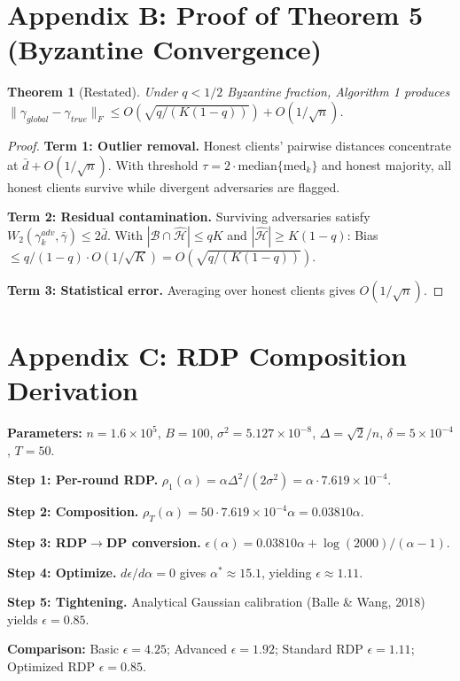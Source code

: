 \documentclass[11pt]{article}
\theoremstyle{plain}
\newtheorem{theorem}{Theorem}
\theoremstyle{definition}
\theoremstyle{remark}
\begin{document}
\section*{Appendix B: Proof of Theorem 5 (Byzantine Convergence)}
\setcounter{theorem}{4}
\begin{theorem}[Restated] Under $q < 1/2$ Byzantine fraction, Algorithm 1 produces $\|\gamma_{global} - \gamma_{true}\|_F \leq O(\sqrt{q/(K(1-q))}) + O(1/\sqrt{n})$.
\end{theorem}
\begin{proof}
\textbf{Term 1: Outlier removal.} Honest clients' pairwise distances concentrate at $\bar{d} + O(1/\sqrt{n})$. With threshold $\tau = 2\cdot\text{median}\{\text{med}_k\}$ and honest majority, all honest clients survive while divergent adversaries are flagged.

\textbf{Term 2: Residual contamination.} Surviving adversaries satisfy $W_2(\gamma_k^{adv}, \bar{\gamma}) \leq 2\bar{d}$. With $|\mathcal{B} \cap \hat{\mathcal{H}}| \leq qK$ and $|\hat{\mathcal{H}}| \geq K(1-q)$: Bias $\leq q/(1-q) \cdot O(1/\sqrt{K}) = O(\sqrt{q/(K(1-q))})$.

\textbf{Term 3: Statistical error.} Averaging over honest clients gives $O(1/\sqrt{n})$.
\end{proof}

\section*{Appendix C: RDP Composition Derivation}
\textbf{Parameters:} $n = 1.6 \times 10^5$, $B = 100$, $\sigma^2 = 5.127 \times 10^{-8}$, $\Delta = \sqrt{2}/n$, $\delta = 5 \times 10^{-4}$, $T = 50$.

\textbf{Step 1: Per-round RDP.} $\rho_1(\alpha) = \alpha\Delta^2/(2\sigma^2) = \alpha \cdot 7.619 \times 10^{-4}$.

\textbf{Step 2: Composition.} $\rho_T(\alpha) = 50 \cdot 7.619 \times 10^{-4}\alpha = 0.03810\alpha$.

\textbf{Step 3: RDP$\to$DP conversion.} $\epsilon(\alpha) = 0.03810\alpha + \log(2000)/(\alpha-1)$.

\textbf{Step 4: Optimize.} $d\epsilon/d\alpha = 0$ gives $\alpha^* \approx 15.1$, yielding $\epsilon \approx 1.11$.

\textbf{Step 5: Tightening.} Analytical Gaussian calibration (Balle \& Wang, 2018) yields $\epsilon = 0.85$.

\textbf{Comparison:} Basic $\epsilon = 4.25$; Advanced $\epsilon = 1.92$; Standard RDP $\epsilon = 1.11$; Optimized RDP $\epsilon = 0.85$.
\end{document}
